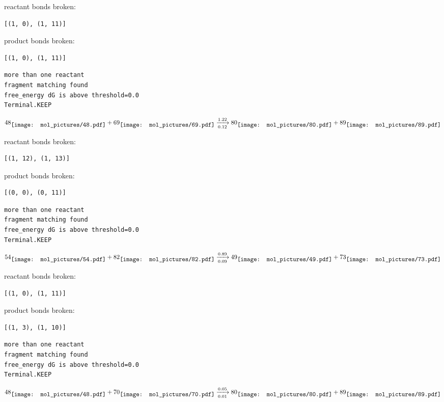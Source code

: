 \documentclass{article}
\begin{document}
reactant bonds broken:\begin{verbatim}
[(1, 0), (1, 11)]
\end{verbatim}
product bonds broken:\begin{verbatim}
[(1, 0), (1, 11)]
\end{verbatim}




\vspace{1cm}
\begin{verbatim}
more than one reactant
fragment matching found
free_energy dG is above threshold=0.0
Terminal.KEEP
\end{verbatim}
$$
48
\raisebox{-.5\height}{\texttt{[image: mol\_pictures/48.pdf]}}
+
69
\raisebox{-.5\height}{\texttt{[image: mol\_pictures/69.pdf]}}
\xrightarrow[0.12]{1.22}
80
\raisebox{-.5\height}{\texttt{[image: mol\_pictures/80.pdf]}}
+
89
\raisebox{-.5\height}{\texttt{[image: mol\_pictures/89.pdf]}}
$$


reactant bonds broken:\begin{verbatim}
[(1, 12), (1, 13)]
\end{verbatim}
product bonds broken:\begin{verbatim}
[(0, 0), (0, 11)]
\end{verbatim}




\vspace{1cm}
\begin{verbatim}
more than one reactant
fragment matching found
free_energy dG is above threshold=0.0
Terminal.KEEP
\end{verbatim}
$$
54
\raisebox{-.5\height}{\texttt{[image: mol\_pictures/54.pdf]}}
+
82
\raisebox{-.5\height}{\texttt{[image: mol\_pictures/82.pdf]}}
\xrightarrow[0.09]{0.89}
49
\raisebox{-.5\height}{\texttt{[image: mol\_pictures/49.pdf]}}
+
73
\raisebox{-.5\height}{\texttt{[image: mol\_pictures/73.pdf]}}
$$


reactant bonds broken:\begin{verbatim}
[(1, 0), (1, 11)]
\end{verbatim}
product bonds broken:\begin{verbatim}
[(1, 3), (1, 10)]
\end{verbatim}




\vspace{1cm}
\begin{verbatim}
more than one reactant
fragment matching found
free_energy dG is above threshold=0.0
Terminal.KEEP
\end{verbatim}
$$
48
\raisebox{-.5\height}{\texttt{[image: mol\_pictures/48.pdf]}}
+
70
\raisebox{-.5\height}{\texttt{[image: mol\_pictures/70.pdf]}}
\xrightarrow[0.01]{0.05}
80
\raisebox{-.5\height}{\texttt{[image: mol\_pictures/80.pdf]}}
+
89
\raisebox{-.5\height}{\texttt{[image: mol\_pictures/89.pdf]}}
$$
\end{document}
